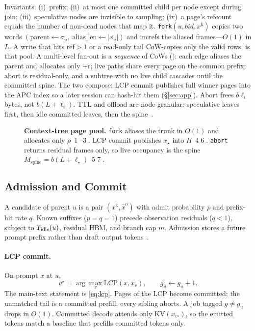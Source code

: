Invariants: (i)~prefix; (ii)~at most one committed child per node except during join; (iii)~speculative nodes are invisible to sampling; (iv)~a page's refcount equals the number of non-dead nodes that map it.
\texttt{fork}$(u,\mathit{bid},x^{\mathrm{k}})$ copies two words $(\mathrm{parent}\leftarrow\sigma_u,\;\mathrm{alias\_len}\leftarrow|x_u|)$ and increfs the aliased frames---$O(1)$ in $L$.
A write that hits $\mathrm{ref}>1$ or a read-only tail CoW-copies only the valid rows.
 is that pool.
A multi-level fan-out is a \emph{sequence} of CoWs (): each edge aliases the parent and allocates only $+$r; live paths share every page on the common prefix; abort is residual-only, and a subtree with no live child cascades until the committed spine.
The two compose: LCP commit publishes full winner pages into the APC index so a later session can hash-hit them (\S\ref{sec:app}).
Abort frees $b\ell_i$ bytes, not $b(L+\ell_i)$.
TTL and offload are node-granular: speculative leaves first, then idle committed leaves, then the spine~\cite{continuum,mori}.

\begin{figure}[t]
\centering
\resizebox{\textwidth}{!}{}
\caption{\textbf{Context-tree page pool.}
\texttt{fork} aliases the trunk in $O(1)$ and allocates only $\rho$~\textcircled{1}--\textcircled{3}.
LCP commit publishes $x_\star$ into $H$~\textcircled{4}\textcircled{6}.
\texttt{abort} returns residual frames only, so live occupancy is the spine $M_{\mathrm{spine}}{=}b(L{+}\ell_\star)$~\textcircled{5}\textcircled{7}.}
\label{fig:pool}
\end{figure}

\subsection{Admission and Commit}
\label{sec:speculate}
A candidate of parent $u$ is a pair $(x^{\mathrm{k}},\hat{x}^{\mathrm{o}})$ with admit probability $p$ and prefix-hit rate $q$.
Known suffixes ($p{=}q{=}1$) precede observation residuals ($q{<}1$), subject to $T_{\mathrm{idle}}(u)$, residual HBM, and branch cap $m$.
Admission stores a future prompt prefix rather than draft output tokens~\cite{speculative,medusa}.

\paragraph{LCP commit.}
On prompt $x$ at $u$,
\begin{equation}
\label{eq:lcp-iv}
v^\star=\arg\max_{v}\mathrm{LCP}(x,x_v),\qquad
g_u\leftarrow g_u+1.
\end{equation}
The main-text statement is \eqref{eq:lcp}.
Pages of the LCP become committed; the unmatched tail is a committed prefill; every sibling aborts.
A job tagged $g\neq g_u$ drops in $O(1)$.
Committed decode attends only $\mathrm{KV}(x_{v^\star})$, so the emitted tokens match a baseline that prefills committed tokens only.

